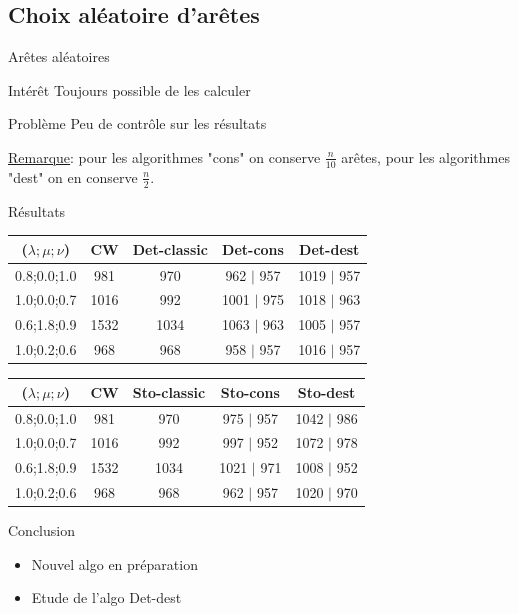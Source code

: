 \documentclass{beamer}
\begin{document}
\subsection{Choix aléatoire d'arêtes}

\begin{frame}{Arêtes aléatoires}

\begin{block}{Intérêt}
Toujours possible de les calculer
\end{block}

\begin{alertblock}{Problème}
Peu de contrôle sur les résultats
\end{alertblock}


\underline{Remarque}: pour les algorithmes "cons" on conserve $\frac{n}{10}$ arêtes, pour les algorithmes "dest" on en conserve $\frac{n}{2}$.

\end{frame}

\begin{frame}{Résultats}

\begin{tabular}{|c|c|c|c|c|}
   \hline
   ($\lambda;\mu;\nu$) & CW & Det-classic & Det-cons & Det-dest \\
   \hline
   0.8;0.0;1.0 &981 & 970 & 962 $|$ 957 & 1019 $|$ 957 \\
   \hline
   1.0;0.0;0.7 &1016& 992 & 1001 $|$ 975 & 1018 $|$ 963 \\
   \hline
   0.6;1.8;0.9 &1532& 1034& 1063 $|$ 963 & 1005 $|$ 957\\
   \hline
   1.0;0.2;0.6 &968& 968 & 958 $|$ 957 & 1016 $|$ 957 \\
   \hline
\end{tabular}

\begin{tabular}{|c|c|c|c|c|}
   \hline
   ($\lambda;\mu;\nu$) & CW & Sto-classic & Sto-cons & Sto-dest \\
   \hline
   0.8;0.0;1.0 &981 & 970 & 975 $|$ 957 & 1042 $|$ 986 \\
   \hline
   1.0;0.0;0.7 &1016& 992 & 997 $|$ 952 & 1072 $|$ 978 \\
   \hline
   0.6;1.8;0.9 &1532& 1034& 1021 $|$ 971 & 1008 $|$ 952\\
   \hline
   1.0;0.2;0.6 &968& 968 & 962 $|$ 957 & 1020 $|$ 970 \\
   \hline
\end{tabular}
\end{frame}

\begin{frame}{Conclusion}
\begin{itemize}
\item Nouvel algo en préparation
\item Etude de l'algo Det-dest
\end{itemize}
\end{frame}
\end{document}
